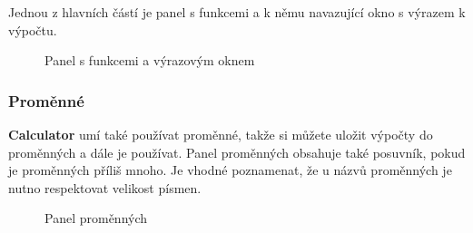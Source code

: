 \documentclass[a4paper, 11pt]{article}
\begin{document}
Jednou z hlavních částí je panel s funkcemi a k němu navazující okno s
výrazem k výpočtu.

\begin{figure}[H]
    \centering
    \caption{Panel s funkcemi a výrazovým oknem}
\end{figure}

\subsubsection{Proměnné}

\textbf{Calculator} umí také používat proměnné, takže si můžete uložit výpočty do
proměnných a dále je používat. Panel proměnných obsahuje také posuvník,
pokud je proměnných příliš mnoho. Je vhodné poznamenat, že u názvů proměnných je nutno respektovat velikost písmen.

\begin{figure}[H]
    \centering
    \caption{Panel proměnných}
\end{figure}
\end{document}

